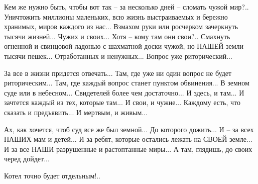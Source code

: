 Кем же нужно быть, чтобы вот так – за несколько дней – сломать чужой мир?..
Уничтожить миллионы маленьких, всю жизнь выстраиваемых и бережно хранимых,
миров каждого из нас... Взмахом руки или росчерком зачеркнуть тысячи жизней... Чужих
и своих... Хотя – кому там они свои?.. Смахнуть огненной и свинцовой ладонью с
шахматной доски чужой, но НАШЕЙ земли тысячи пешек... Отработанных и ненужных...
Вопрос уже риторический...

За все в жизни придется отвечать... Там, где уже ни один вопрос не будет
риторическим... Там, где каждый вопрос станет пунктом обвинения... В земном суде
или в небесном... Свидетелей более чем достаточно... И здесь, и там... И зачтется
каждый из тех, которые там... И свои, и чужие... Каждому есть, что сказать и
предъявить... И мертвым, и живым...

Ах, как хочется, чтоб суд все же был земной... До которого дожить... И – за всех
НАШИХ мам и детей... И за ребят, которые остались лежать на СВОЕЙ земле... И за все
НАШИ разрушенные и растоптанные миры... А там, глядишь, до своих черед дойдет...

Котел точно будет отдельным!..

